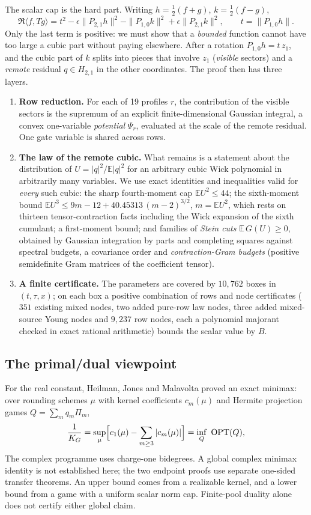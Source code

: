 \documentclass[11pt,a4paper]{article}
\newcommand{\E}{\mathbb{E}}
\begin{document}
The scalar cap is the hard part. Writing $h=\tfrac12(f+g)$, $k=\tfrac12(f-g)$,
\[
 \Re\langle f,Tg\rangle=t^2-\epsilon\|P_{2,1}h\|^2-\|P_{1,0}k\|^2+\epsilon\|P_{2,1}k\|^2,\qquad t=\|P_{1,0}h\|.
\]
Only the last term is positive: we must show that a \emph{bounded} function cannot have too large a cubic part without
paying elsewhere. After a rotation $P_{1,0}h=t\,z_1$, and the cubic part of $k$ splits into pieces that involve $z_1$
(\emph{visible} sectors) and a \emph{remote} residual $q\in H_{2,1}$ in the other coordinates. The proof then has three layers.
\begin{enumerate}
\item \textbf{Row reduction.} For each of 19 profiles $r$, the contribution of the visible sectors is the supremum of an
 explicit finite-dimensional Gaussian integral, a convex one-variable \emph{potential} $\Psi_r$, evaluated at the scale of
 the remote residual. One gate variable is shared across rows.
\item \textbf{The law of the remote cubic.} What remains is a statement about the distribution of $U=|q|^2/\E|q|^2$ for an
 arbitrary cubic Wick polynomial in arbitrarily many variables. We use exact identities and inequalities valid for
 \emph{every} such cubic: the sharp fourth-moment cap $\E U^2\le44$; the sixth-moment bound
 $\E U^3\le9m-12+40.45313\,(m-2)^{3/2}$, $m=\E U^2$, which rests on thirteen tensor-contraction facts including the Wick
 expansion of the sixth cumulant; a first-moment bound; and families of \emph{Stein cuts}
 $\E\,G(U)\ge0$, obtained by Gaussian integration by parts and completing squares against spectral budgets, a covariance
 order and \emph{contraction-Gram budgets} (positive semidefinite Gram matrices of the coefficient tensor).
\item \textbf{A finite certificate.} The parameters are covered by $10{,}762$ boxes in $(t,\tau,x)$; on each box a positive
 combination of rows and node certificates ($351$ existing mixed nodes, two added pure-row law nodes, three added mixed-source Young nodes and $9{,}237$ row nodes, each a polynomial majorant checked in
 exact rational arithmetic) bounds the scalar value by $B$.
\end{enumerate}

\subsection{The primal/dual viewpoint}
For the real constant, Heilman, Jones and Malavolta proved an exact minimax: over rounding schemes $\mu$ with kernel
coefficients $c_m(\mu)$ and Hermite projection games $Q=\sum_m q_m\Pi_m$,
\[
 \frac1{K_G}=\sup_\mu\Bigl[c_1(\mu)-\sum_{m\ge3}|c_m(\mu)|\Bigr]=\inf_Q\ \mathrm{OPT}(Q),
\]
The complex programme uses charge-one bidegrees. A global complex minimax identity is not established here;
the two endpoint proofs use separate one-sided transfer theorems. An upper bound comes from a realizable kernel,
and a lower bound from a game with a uniform scalar norm cap. Finite-pool duality alone does not certify either global claim.
\end{document}
